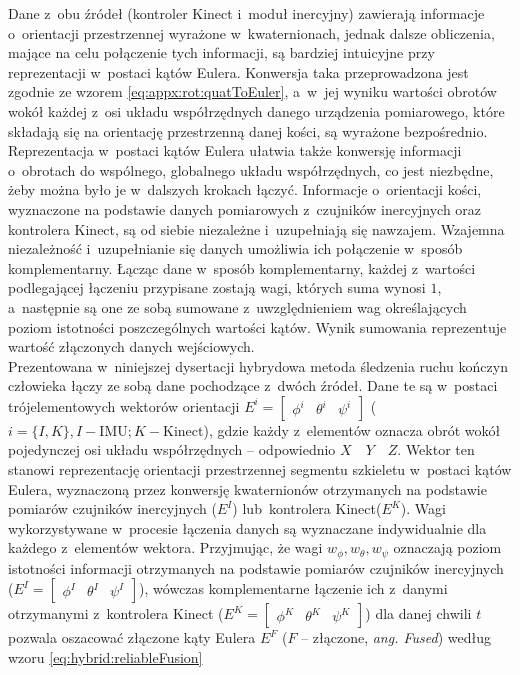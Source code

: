 Dane z~obu źródeł (kontroler Kinect i~moduł inercyjny) zawierają informacje o~orientacji przestrzennej wyrażone w~kwaternionach, jednak dalsze obliczenia, mające na celu połączenie tych informacji, są bardziej intuicyjne przy reprezentacji w~postaci kątów Eulera. Konwersja taka przeprowadzona jest zgodnie ze wzorem \ref{eq:appx:rot:quatToEuler}, a~w~jej wyniku wartości obrotów wokół każdej z~osi układu współrzędnych danego urządzenia pomiarowego, które składają się na orientację przestrzenną danej kości, są wyrażone bezpośrednio. Reprezentacja w~postaci kątów Eulera ułatwia także konwersję informacji o~obrotach do wspólnego, globalnego układu współrzędnych, co jest niezbędne, żeby można było je w~dalszych krokach łączyć. Informacje o~orientacji kości, wyznaczone na podstawie danych pomiarowych z~czujników inercyjnych oraz kontrolera Kinect, są od siebie niezależne i~uzupełniają się nawzajem. Wzajemna niezależność i~uzupełnianie się danych umożliwia ich połączenie w~sposób komplementarny. Łącząc dane w~sposób komplementarny, każdej z~wartości podlegającej łączeniu przypisane zostają wagi, których suma wynosi $1$, a~następnie są one ze sobą sumowane z~uwzględnieniem wag określających poziom istotności poszczególnych wartości kątów. Wynik sumowania reprezentuje wartość złączonych danych wejściowych. \\
										
Prezentowana w~niniejszej dysertacji hybrydowa metoda śledzenia ruchu kończyn człowieka łączy ze sobą dane pochodzące z~dwóch źródeł. Dane te są w~postaci trójelementowych wektorów orientacji $E^i = \begin{bmatrix} \phi^i &  \theta^i & \psi^i \end{bmatrix}$ ($i = \{I,K\}, I-\text{IMU}; K-\text{Kinect}$), gdzie każdy z~elementów oznacza obrót wokół pojedynczej osi układu współrzędnych -- odpowiednio $X \quad Y \quad Z$. Wektor ten stanowi reprezentację orientacji przestrzennej segmentu szkieletu w~postaci kątów Eulera, wyznaczoną przez konwersję kwaternionów otrzymanych na podstawie pomiarów czujników inercyjnych ($E^I$) lub~kontrolera Kinect($E^K$). Wagi wykorzystywane w~procesie łączenia danych są wyznaczane indywidualnie dla każdego z~elementów wektora. Przyjmując, że wagi $w_\phi , w_\theta , w_\psi$ oznaczają poziom istotności informacji otrzymanych na podstawie pomiarów czujników inercyjnych ($E^I = \begin{bmatrix}  \phi^I &  \theta^I &  \psi^I \end{bmatrix}$), wówczas komplementarne łączenie ich z~danymi otrzymanymi z~kontrolera Kinect ($E^K = \begin{bmatrix}  \phi^K &  \theta^K &  \psi^K \end{bmatrix}$) dla danej chwili $t$ pozwala oszacować złączone kąty Eulera $E^F$ ($F$ -- złączone, \emph{ang. Fused}) według wzoru \ref{eq:hybrid:reliableFusion}
										
